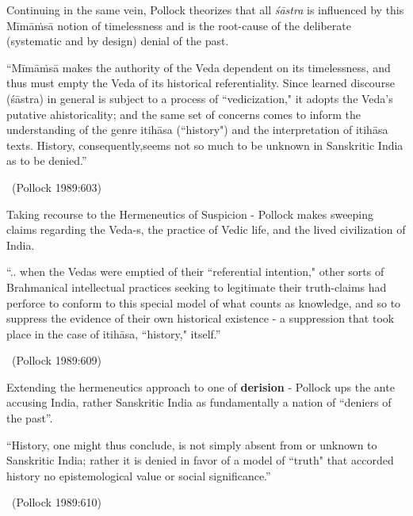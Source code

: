 Continuing in the same vein, Pollock theorizes that all \textit{śāstra} is influenced by this Mīmāṁsā notion of timelessness and is the root-cause of the deliberate (systematic and by design) denial of the past.

\vskip 3pt

\begin{myquote}
“Mīmāṁsā makes the authority of the Veda dependent on its timelessness, and thus must empty the Veda of its historical referentiality. Since learned discourse (śāstra) in general is subject to a process of “vedicization," it adopts the Veda's putative ahistoricality; and the same set of concerns comes to inform the understanding of the genre itihāsa (“history") and the interpretation of itihāsa texts. History, consequently,\break seems not so much to be unknown in Sanskritic India as to be denied.”

~\hfill (Pollock 1989:603)
\end{myquote}

Taking recourse to the Hermeneutics of Suspicion - Pollock makes sweeping claims regarding the Veda-s, the practice of Vedic life, and the lived civilization of India.

\begin{myquote}
“.. when the Vedas were emptied of their “referential intention," other sorts of Brahmanical intellectual practices seeking to legitimate their truth-claims had perforce to conform to this special model of what counts as knowledge, and so to suppress the evidence of their own historical existence - a suppression that took place in the case of itihāsa, “history," itself.”

~\hfill (Pollock 1989:609)
\end{myquote}

Extending the hermeneutics approach to one of \textbf{derision }- Pollock ups the ante accusing India, rather Sanskritic India as fundamentally a nation of “deniers of the past”.

\begin{myquote}
“History, one might thus conclude, is not simply absent from or unknown to Sanskritic India; rather it is denied in favor of a model of ``truth" that accorded history no epistemological value or social significance.”

~\hfill (Pollock 1989:610)
\end{myquote}

